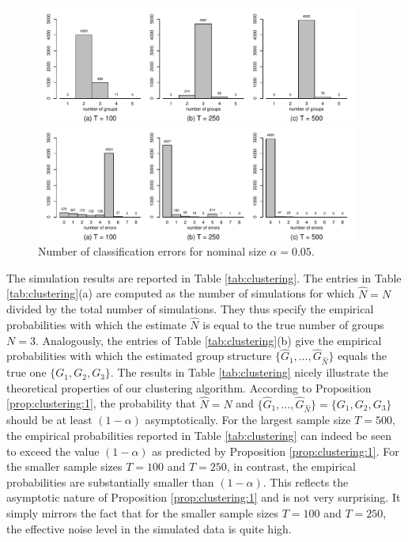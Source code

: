 \documentclass[12pt]{article}
\begin{document}
\begin{figure}[t!]
\centering
\includegraphics[width=0.95\textwidth]{../output/hist_groups}
\caption{{\color{red}Estimated number of groups $\widehat{N}$ for nominal size $\alpha = 0.05$. }
}\label{fig:clustering:1}
\vspace{0.25cm}

\includegraphics[width=0.95\textwidth]{../output/hist_errors}
\caption{{\color{red}Number of classification errors for nominal size $\alpha = 0.05$. }
}\label{fig:clustering:2}
\end{figure}


The simulation results are reported in Table \ref{tab:clustering}. The entries in Table \ref{tab:clustering}(a) are computed as the number of simulations for which $\widehat{N} = N$ divided by the total number of simulations. They thus specify the empirical probabilities with which the estimate $\widehat{N}$ is equal to the true number of groups $N = 3$. Analogously, the entries of Table \ref{tab:clustering}(b) give the empirical probabilities with which the estimated group structure $\{ \widehat{G}_1,\ldots,\widehat{G}_{\widehat{N}}\}$ equals the true one $\{G_1,G_2,G_3\}$. The results in Table \ref{tab:clustering} nicely illustrate the theoretical properties of our clustering algorithm. According to Proposition \ref{prop:clustering:1}, the probability that $\widehat{N} = N$ and $\{ \widehat{G}_1,\ldots,\widehat{G}_{\widehat{N}}\} = \{G_1,G_2,G_3\}$ should be at least $(1-\alpha)$ asymptotically. {\color{red}For the largest sample size $T = 500$, the empirical probabilities reported in Table \ref{tab:clustering} can indeed be seen to exceed the value $(1-\alpha)$ as predicted by Proposition \ref{prop:clustering:1}. For the smaller sample sizes $T=100$ and $T=250$, in contrast, the empirical probabilities are substantially smaller than $(1-\alpha)$. This reflects the asymptotic nature of Proposition \ref{prop:clustering:1} and is not very surprising. It simply mirrors the fact that for the smaller sample sizes $T=100$ and $T=250$, the effective noise level in the simulated data is quite high.}
\end{document}
